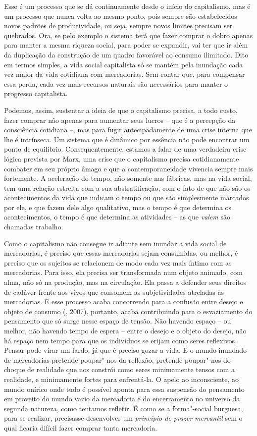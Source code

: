 Esse é um processo que se dá continuamente desde o início do
capitalismo, mas é um processo que nunca volta ao mesmo ponto, pois
sempre são estabelecidos novos padrões de produtividade, ou seja, sempre
novos limites precisam ser quebrados. Ora, se pelo exemplo o sistema
terá que fazer comprar o dobro apenas para manter a mesma riqueza
social, para poder se expandir, vai ter que ir além da duplicação da
construção de um quadro favorável ao consumo ilimitado. Dito em termos
simples, a vida social capitalista só se mantém pela inundação cada vez
maior da vida cotidiana com mercadorias. Sem contar que, para compensar
essa perda, cada vez mais recursos naturais são necessários para manter
o progresso capitalista.

Podemos, assim, sustentar a ideia de que o capitalismo precisa, a todo
custo, fazer comprar não apenas para aumentar seus lucros -- que é a
percepção da consciência cotidiana --, mas para fugir antecipadamente de
uma crise interna que lhe é intrínseca. Um sistema que é dinâmico por
essência não pode encontrar um ponto de equilíbrio. Consequentemente,
estamos a falar de uma verdadeira crise lógica prevista por Marx, uma
crise que o capitalismo precisa cotidianamente combater em seu próprio
âmago e que a contemporaneidade vivencia sempre mais fortemente. A
aceleração do tempo, não somente nas fábricas, mas na vida social, tem
uma relação estreita com a sua abstratificação, com o fato de que não
são os acontecimentos da vida que indicam o tempo ou que são
simplesmente marcados por ele, e que fazem dele algo qualitativo, mas o
tempo é que determina os acontecimentos, o tempo é que determina as
atividades -- as que \emph{valem} são chamadas trabalho.

Como o capitalismo não consegue ir adiante sem inundar a vida social de
mercadorias, é preciso que essas mercadorias sejam consumidas, ou
melhor, é preciso que os sujeitos se relacionem de modo cada vez mais
íntimo com as mercadorias. Para isso, ela precisa ser transformada num
objeto animado, com alma, não só na produção, mas na circulação. Ela
passa a defender seus direitos de cadáver frente aos vivos que consomem
as subjetividades atreladas às mercadorias. E esse processo acaba
concorrendo para a confusão entre desejo e objeto de consumo (,
2007), portanto, acaba contribuindo para o esvaziamento do pensamento
que só surge nesse espaço de tensão. Não havendo espaço -- ou melhor,
não havendo tempo de espera -- entre o desejo e o objeto do desejo, não
há espaço nem tempo para que os indivíduos se erijam como seres
reflexivos. Pensar pode virar um fardo, já que é preciso gozar a vida. E
o mundo inundado de mercadorias pretende poupar"-nos da reflexão,
pretende poupar"-nos do choque de realidade que nos constrói como seres
minimamente tensos com a realidade, e minimamente fortes para
enfrentá-la. O apelo ao inconsciente, ao mundo onírico onde tudo é
possível aponta para essa suspensão do pensamento em proveito do mundo
vazio da mercadoria e do encerramento no universo da segunda natureza,
como tentamos refletir. É como se a forma"-social burguesa, para se
realizar, precisasse desenvolver um \emph{princípio de prazer mercantil}
sem o qual ficaria difícil fazer comprar tanta mercadoria.

